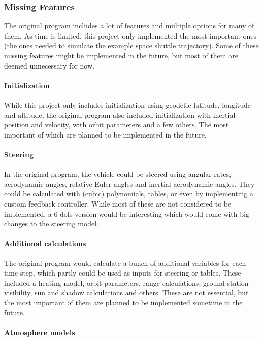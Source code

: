 \subsubsection{Missing Features}\label{missing-features}

The original program includes a lot of features and multiple options for many
of them. As time is limited, this project only implemented the most important
ones (the ones needed to simulate the example space shuttle trajectory). Some
of these missing features might be implemented in the future, but most of them
are deemed unnecessary for now.

\paragraph{Initialization}

While this project only includes initialization using geodetic latitude,
longitude and altitude, the original program also included initialization with
inertial position and velocity, with orbit parameters and a few others. The
most important of which are planned to be implemented in the future.

\paragraph{Steering}

In the original program, the vehicle could be steered using angular rates,
aerodynamic angles, relative Euler angles and inertial aerodynamic angles.
They could be calculated with (cubic) polynomials, tables, or even by
implementing a custom feedback controller. While most of these are not
considered to be implemented, a 6 \glspl{dof} version would be interesting which would come with big changes to
the steering model.

\paragraph{Additional calculations}

The original program would calculate a bunch of additional variables for each
time step, which partly could be used as inputs for steering or tables. These
included a heating model, orbit parameters, range calculations, ground station
visibility, sun and shadow calculations and others. These are not essential,
but the most important of them are planned to be implemented sometime in the
future.

\paragraph{Atmosphere models}

